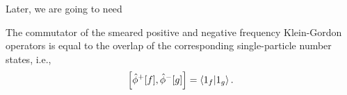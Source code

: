 Later, we are going to need
\begin{lemma}\label{thm:single_partiicle_number_state_inner_product_pn_smeared_kg_comm}
	The commutator of the smeared positive and negative frequency Klein-Gordon operators is equal to the overlap of the corresponding single-particle number states, i.e.,
	\begin{equation}
		\comm{\hat\phi^+[f]}{\hat\phi^-[g]}
		=
		\braket{1_f}{1_g}
		.
	\end{equation}
\end{lemma}